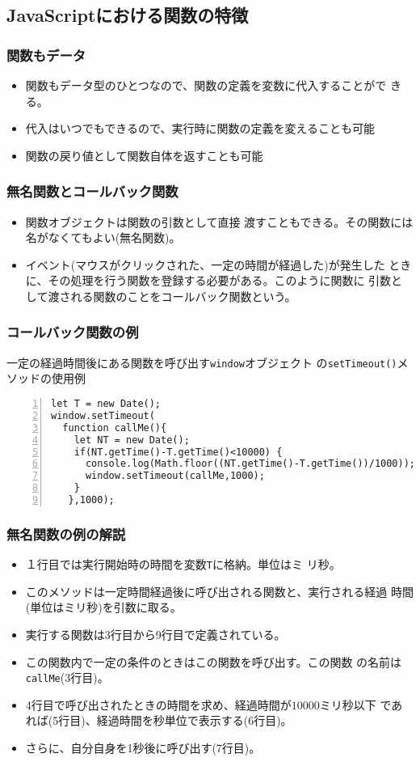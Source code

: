 \subsection{JavaScriptにおける関数の特徴}
\begin{frame}[containsverbatim]
\frametitle{関数もデータ}
\begin{itemize}
 \item 関数もデータ型のひとつなので、関数の定義を変数に代入することがで
       きる。
 \item 代入はいつでもできるので、実行時に関数の定義を変えることも可能
 \item 関数の戻り値として関数自体を返すことも可能
\end{itemize}
\end{frame}
\begin{frame}[containsverbatim]
\frametitle{無名関数とコールバック関数}
\begin{itemize}
 \item 関数オブジェクトは関数の引数として直接
渡すこともできる。その関数には名がなくてもよい(無名関数)。
 \item イベント(マウスがクリックされた、一定の時間が経過した)が発生した
       ときに、その処理を行う関数を登録する必要がある。このように関数に
       引数として渡される関数のことをコールバック関数という。
\end{itemize}
\end{frame}
\begin{frame}[containsverbatim]
\frametitle{コールバック関数の例}
一定の経過時間後にある関数を呼び出す\Verb+window+オブジェクト
 の\Verb+setTimeout()+メソッドの使用例

 \hspace*{1zw}\begin{minipage}[t]{0.9\textwidth}
\begin{Verbatim}[numbers=left]
let T = new Date();
window.setTimeout(
  function callMe(){
    let NT = new Date();
    if(NT.getTime()-T.getTime()<10000) {
      console.log(Math.floor((NT.getTime()-T.getTime())/1000));
      window.setTimeout(callMe,1000);
    }
   },1000);
\end{Verbatim}
\end{minipage}
\end{frame}
\begin{frame}[containsverbatim]
\frametitle{無名関数の例の解説}
\begin{itemize}
 \item １行目では実行開始時の時間を変数\Verb+T+に格納。単位はミ
       リ秒。
 \item このメソッドは一定時間経過後に呼び出される関数と、実行される経過
       時間(単位はミリ秒)を引数に取る。
 \item 実行する関数は3行目から9行目で定義されている。
 \item この関数内で一定の条件のときはこの関数を呼び出す。この関数
       の名前は\Verb+callMe+(3行目)。
 \item 4行目で呼び出されたときの時間を求め、経過時間が$10000$ミリ秒以下
       であれば(5行目)、経過時間を秒単位で表示する(6行目)。
 \item さらに、自分自身を1秒後に呼び出す(7行目)。
\end{itemize}
\end{frame}

